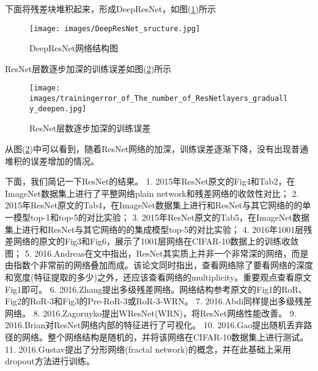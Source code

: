             \par
            下面将残差块堆积起来，形成DeepResNet，如图(\ref{fig:DeepResNet网络结构图})所示
            \begin{figure}[H]
            \centering
            \texttt{[image: images/DeepResNet\_sructure.jpg]}
            \caption{DeepResNet网络结构图}
            \label{fig:DeepResNet网络结构图}
            \end{figure}
            \par
            ResNet层数逐步加深的训练误差如图(\ref{fig:ResNet层数逐步加深的训练误差})所示
            \begin{figure}[H]
            \centering
            \texttt{[image: images/trainingerror\_of\_The\_number\_of\_ResNetlayers\_gradually\_deepen.jpg]}
            \caption{ResNet层数逐步加深的训练误差}
            \label{fig:ResNet层数逐步加深的训练误差}
            \end{figure}
            从图(\ref{fig:ResNet层数逐步加深的训练误差})中可以看到，随着ResNet网络的加深，训练误差逐渐下降，没有出现普通堆积的误差增加的情况。
            \par
            下面，我们简记一下ResNet的结果。
            1. 2015年ResNet原文\cite{2015.HeKaiming}的Fig4和Tab2，在ImageNet数据集上进行了平整网络plain network和残差网络的收敛性对比；
            2. 2015年ResNet原文\cite{2015.HeKaiming}的Tab4，在ImageNet数据集上进行和ResNet与其它网络的的单一模型top-1和top-5的对比实验；
            3. 2015年ResNet原文\cite{2015.HeKaiming}的Tab5，在ImageNet数据集上进行和ResNet与其它网络的的集成模型top-5的对比实验；
            4. 2016年1001层残差网络的原文\cite{2016.Kaiming}的Fig3和Fig6，展示了1001层网络在CIFAR-10数据上的训练收敛图；
            5. 2016.Andreas在文\cite{2016.Andreas}中指出，ResNet其实质上并非一个非常深的网络，而是由指数个非常前的网络叠加而成。该论文同时指出，查看网络除了要看网络的深度和宽度(特征提取的多少)之外，还应该查看网络的multiplicity。重要观点查看原文Fig1即可。
            6. 2016.Zhang\cite{2016.Zhang}提出多级残差网络。网络结构参考原文\cite{2016.Zhang}的Fig1的RoR、Fig2的RoR-3和Fig3的Pre-RoR-3或RoR-3-WRN。
            7. 2016.Abdi\cite{2016.Abdi}同样提出多级残差网络。
            8. 2016.Zagoruyko\cite{2016.Zagoruyko}提出WResNet(WRN)，将ResNet网络性能改善。
            9. 2016.Brian\cite{2016.Brian}对ResNet网络内部的特征进行了可视化。
            10. 2016.Gao\cite{2016.Gao}提出随机丢弃路径的网络。整个网络结构是随机的，并将该网络在CIFAR-10数据集上进行测试。
            11. 2016.Gustav\cite{2016.Gustav}提出了分形网络(fractal network)的概念，并在此基础上采用dropout方法进行训练。
